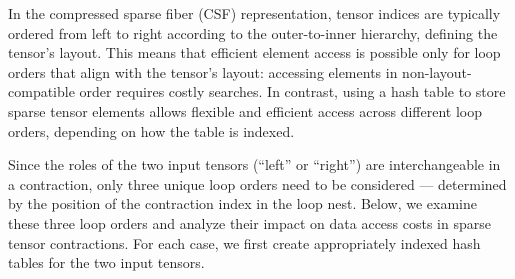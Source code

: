 
In the compressed sparse fiber (CSF) representation, tensor indices are typically ordered from left to right according to the outer-to-inner hierarchy, defining the tensor’s layout. This means that efficient element access is possible 
only for loop orders that align with the tensor’s layout: accessing elements in non-layout-compatible order requires costly searches. In contrast, using a hash table to store sparse tensor elements allows flexible and efficient access across different loop orders, depending on how the table is indexed. 

Since the roles of the two input tensors (``left'' or ``right'') are interchangeable in a contraction, only three unique loop orders need to be considered — determined by the position of the contraction index in the loop nest. Below, we examine these three loop orders and analyze their impact on data access costs in sparse tensor contractions.
For each case, we first create appropriately indexed hash tables for the two input tensors.





